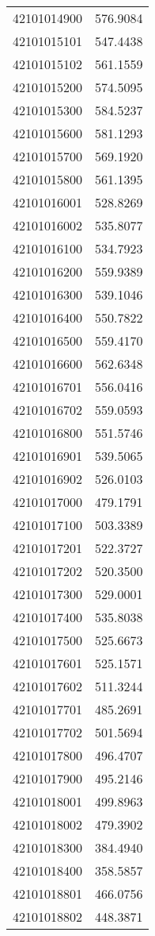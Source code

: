 \begin{longtable}[t]{lr}
42101014900 & 576.9084\\
42101015101 & 547.4438\\
42101015102 & 561.1559\\
42101015200 & 574.5095\\
42101015300 & 584.5237\\
42101015600 & 581.1293\\
42101015700 & 569.1920\\
42101015800 & 561.1395\\
42101016001 & 528.8269\\
42101016002 & 535.8077\\
42101016100 & 534.7923\\
42101016200 & 559.9389\\
42101016300 & 539.1046\\
42101016400 & 550.7822\\
42101016500 & 559.4170\\
42101016600 & 562.6348\\
42101016701 & 556.0416\\
42101016702 & 559.0593\\
42101016800 & 551.5746\\
42101016901 & 539.5065\\
42101016902 & 526.0103\\
42101017000 & 479.1791\\
42101017100 & 503.3389\\
42101017201 & 522.3727\\
42101017202 & 520.3500\\
42101017300 & 529.0001\\
42101017400 & 535.8038\\
42101017500 & 525.6673\\
42101017601 & 525.1571\\
42101017602 & 511.3244\\
42101017701 & 485.2691\\
42101017702 & 501.5694\\
42101017800 & 496.4707\\
42101017900 & 495.2146\\
42101018001 & 499.8963\\
42101018002 & 479.3902\\
42101018300 & 384.4940\\
42101018400 & 358.5857\\
42101018801 & 466.0756\\
42101018802 & 448.3871\\

\end{longtable}
